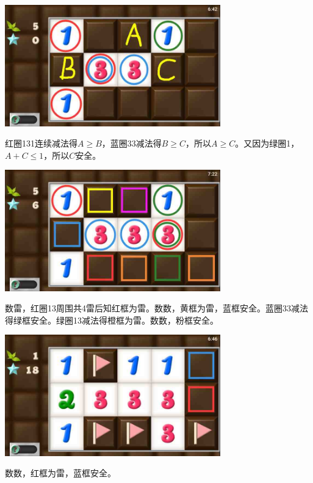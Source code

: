 \subsection{} %
\begin{center}
    \includegraphics[width=0.7\textwidth]{puzzlelow/108-1.jpg}
\end{center}
红圈131连续减法得$A\ge B$，蓝圈33减法得$B\ge C$，所以$A\ge C$。又因为绿圈1，$A+C\le 1$，所以$C$安全。
\begin{center}
    \includegraphics[width=0.7\textwidth]{puzzlelow/108-2.jpg}
\end{center}
数雷，红圈13周围共4雷后知红框为雷。数数，黄框为雷，蓝框安全。蓝圈33减法得绿框安全。绿圈13减法得橙框为雷。数数，粉框安全。
\begin{center}
    \includegraphics[width=0.7\textwidth]{puzzlelow/108-3.jpg}
\end{center}
数数，红框为雷，蓝框安全。

